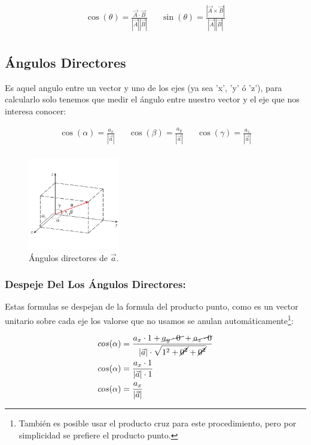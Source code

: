 \documentclass{article}
\begin{document}
\[ \begin{aligned}
\cos(\theta) = \frac{\vec{A} \cdot \vec{B}}{|\vec{A}||\vec{B}|} &&
\sin(\theta) = \frac{|\vec{A}\times\vec{B}|}{|\vec{A}||\vec{B}|} \\
\end{aligned} \]

\subsection{Ángulos Directores}
\label{sec:org4a9e545}
Es aquel angulo entre un vector y uno de los ejes (ya sea 'x', 'y' ó 'z'), para calcularlo solo tenemos que medir el ángulo entre nuestro vector y el eje que nos interesa conocer:

\[\begin{aligned}
  \cos(\alpha) = \frac{a_x}{|\vec{a}|} &&
  \cos(\beta)  = \frac{a_y}{|\vec{a}|} &&
  \cos(\gamma) = \frac{a_z}{|\vec{a}|} \\
\end{aligned} \]

\begin{figure}[htbp]
\centering
\includegraphics[width=4cm]{img/angulos-directores.png}
\caption{Ángulos directores de \(\vec{a}\).}
\end{figure}


\subsubsection*{Despeje Del Los Ángulos Directores:}
\label{sec:org6688079}
Estas formulas se despejan de la formula del producto punto, como es un vector unitario sobre cada eje los valorse que no usamos se anulan automáticamente\footnote{También es posible usar el producto cruz para este procedimiento, pero por simplicidad se prefiere el producto punto.}:

\[\begin{aligned}
  cos(\alpha) &= \frac{a_x \cdot 1 + \cancel{a_y \cdot 0~} + \cancel{a_z \cdot 0} }{|\vec{a}| \cdot \sqrt{1^2+\cancel{0^2}+\cancel{0^2}}} \\
  cos(\alpha) &= \frac{a_x \cdot 1}{|\vec{a}| \cdot 1} \\
  cos(\alpha) &= \frac{a_x}{|\vec{a}|} \\
\end{aligned} \]
\end{document}

